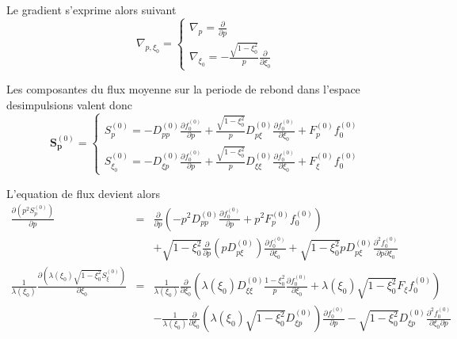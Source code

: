 Le gradient s'exprime alors suivant \[
\nabla_{p,\xi_{0}}=\left\{ \begin{array}{l}
\nabla_{p}=\frac{\partial}{\partial p}\\
\nabla_{\xi_{0}}=-\frac{\sqrt{1-\xi_{0}^{2}}}{p}\frac{\partial}{\partial\xi_{0}}\end{array}\right.\]


Les composantes du flux moyenne sur la periode de rebond dans l'espace
desimpulsions valent donc \[
\mathbf{S}_{\mathbf{p}}^{(0)}=\left\{ \begin{array}{l}
S_{p}^{(0)}=-D_{pp}^{(0)}\frac{\partial f_{0}^{(0)}}{\partial p}+\frac{\sqrt{1-\xi_{0}^{2}}}{p}D_{p\xi}^{(0)}\frac{\partial f_{0}^{(0)}}{\partial\xi_{0}}+F_{p}^{(0)}f_{0}^{(0)}\\
S_{\xi_{0}}^{(0)}=-D_{\xi p}^{(0)}\frac{\partial f_{0}^{(0)}}{\partial p}+\frac{\sqrt{1-\xi_{0}^{2}}}{p}D_{\xi\xi}^{(0)}\frac{\partial f_{0}^{(0)}}{\partial\xi_{0}}+F_{\xi}^{(0)}f_{0}^{(0)}\end{array}\right.\]


L'equation de flux devient alors \begin{eqnarray*}
\frac{\partial\left(p^{2}S_{p}^{(0)}\right)}{\partial p} & = & \frac{\partial}{\partial p}\left(-p^{2}D_{pp}^{(0)}\frac{\partial f_{0}^{(0)}}{\partial p}+p^{2}F_{p}^{(0)}f_{0}^{(0)}\right)\\
 &  & +\sqrt{1-\xi_{0}^{2}}\frac{\partial}{\partial p}\left(pD_{p\xi}^{(0)}\right)\frac{\partial f_{0}^{(0)}}{\partial\xi_{0}}+\sqrt{1-\xi_{0}^{2}}pD_{p\xi}^{(0)}\frac{\partial^{2}f_{0}^{(0)}}{\partial p\partial\xi_{0}}\\
\frac{1}{\lambda\left(\xi_{0}\right)}\frac{\partial\left(\lambda\left(\xi_{0}\right)\sqrt{1-\xi_{0}^{2}}S_{\xi}^{(0)}\right)}{\partial\xi_{0}} & = & \frac{1}{\lambda\left(\xi_{0}\right)}\frac{\partial}{\partial\xi_{0}}\left(\lambda\left(\xi_{0}\right)D_{\xi\xi}^{(0)}\frac{1-\xi_{0}^{2}}{p}\frac{\partial f_{0}^{(0)}}{\partial\xi_{0}}+\lambda\left(\xi_{0}\right)\sqrt{1-\xi_{0}^{2}}F_{\xi}f_{0}^{(0)}\right)\\
 &  & -\frac{1}{\lambda\left(\xi_{0}\right)}\frac{\partial}{\partial\xi_{0}}\left(\lambda\left(\xi_{0}\right)\sqrt{1-\xi_{0}^{2}}D_{\xi p}^{(0)}\right)\frac{\partial f_{0}^{(0)}}{\partial p}-\sqrt{1-\xi_{0}^{2}}D_{\xi p}^{(0)}\frac{\partial^{2}f_{0}^{(0)}}{\partial\xi_{0}\partial p}\end{eqnarray*}


